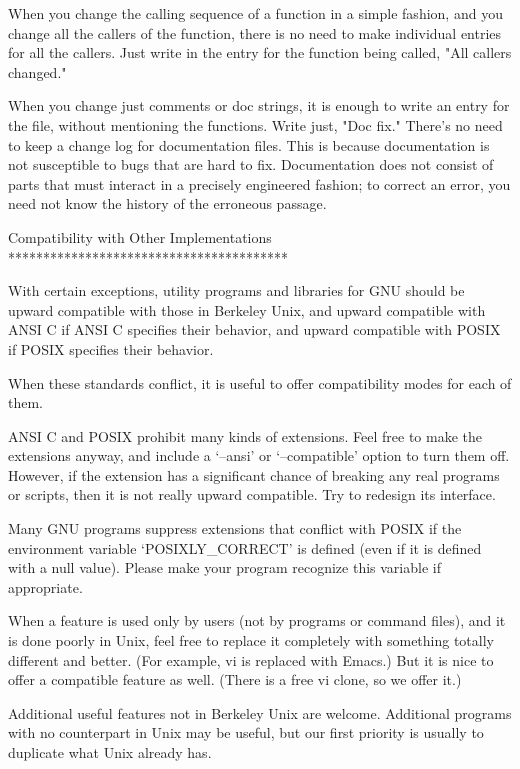    When you change the calling sequence of a function in a simple
fashion, and you change all the callers of the function, there is no
need to make individual entries for all the callers.  Just write in the
entry for the function being called, "All callers changed."

   When you change just comments or doc strings, it is enough to write
an entry for the file, without mentioning the functions.  Write just,
"Doc fix."  There's no need to keep a change log for documentation
files.  This is because documentation is not susceptible to bugs that
are hard to fix.  Documentation does not consist of parts that must
interact in a precisely engineered fashion; to correct an error, you
need not know the history of the erroneous passage.

Compatibility with Other Implementations
****************************************

   With certain exceptions, utility programs and libraries for GNU
should be upward compatible with those in Berkeley Unix, and upward
compatible with ANSI C if ANSI C specifies their behavior, and upward
compatible with POSIX if POSIX specifies their behavior.

   When these standards conflict, it is useful to offer compatibility
modes for each of them.

   ANSI C and POSIX prohibit many kinds of extensions.  Feel free to
make the extensions anyway, and include a `--ansi' or `--compatible'
option to turn them off.  However, if the extension has a significant
chance of breaking any real programs or scripts, then it is not really
upward compatible.  Try to redesign its interface.

   Many GNU programs suppress extensions that conflict with POSIX if the
environment variable `POSIXLY_CORRECT' is defined (even if it is
defined with a null value).  Please make your program recognize this
variable if appropriate.

   When a feature is used only by users (not by programs or command
files), and it is done poorly in Unix, feel free to replace it
completely with something totally different and better.  (For example,
vi is replaced with Emacs.)  But it is nice to offer a compatible
feature as well.  (There is a free vi clone, so we offer it.)

   Additional useful features not in Berkeley Unix are welcome.
Additional programs with no counterpart in Unix may be useful, but our
first priority is usually to duplicate what Unix already has.

